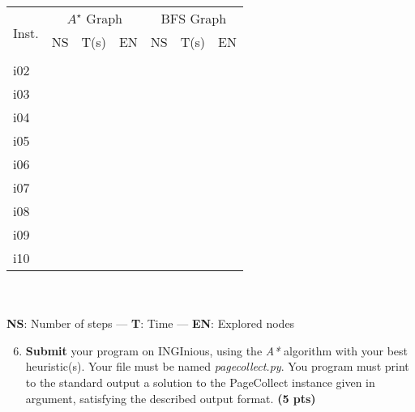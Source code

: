 \documentclass[11pt,a4paper]{report}
\begin{document}
\begin{answers}[6.5cm]
\begin{center}
\begin{tabular}{||l||l|l|l||l|l|l||}
\hline
\multirow{3}{*}{Inst.} & \multicolumn{3}{c||}{$A^{\star}$ Graph} & \multicolumn{3}{c||}{BFS Graph} \\
 & NS & T(s) & EN & NS & T(s) & EN\\
\hline
i01 & & & & & &\\
\hline
i02 & & & & & &\\
\hline
i03 & & & & & &\\
\hline
i04 & & & & & &\\
\hline
i05 & & & & & &\\
\hline
i06 & & & & & &\\
\hline
i07 & & & & & &\\
\hline
i08 & & & & & &\\
\hline
i09 & & & & & &\\
\hline
i10 & & & & & &\\
\hline
\end{tabular}\\

~\\
\textbf{NS}: Number of steps — \textbf{T}: Time — \textbf{EN}: Explored nodes
\end{center}
\end{answers}



\begin{enumerate}
\setcounter{enumi}{5}
\item \textbf{Submit} your program on INGInious, using the \textit{A*} algorithm with your best heuristic(s).
		 Your file must be named \emph{pagecollect.py}. 
		 You program must print to the standard output a solution to the PageCollect instance given in argument, satisfying the described output format.  \textbf{(5 pts)}
\end{enumerate}

\begin{answer}
\end{answer}
\end{document}
